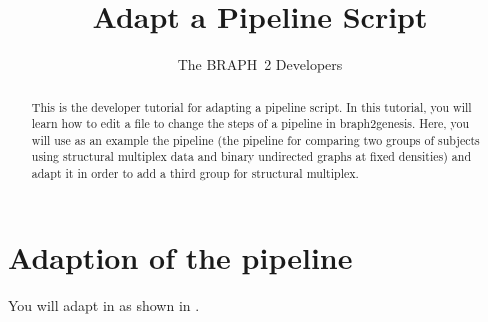 \documentclass{tufte-handout}
\title{Adapt a Pipeline Script}
\author[The BRAPH~2 Developers]{The BRAPH~2 Developers}
\begin{document}
\maketitle

\begin{abstract}
\noindent
This is the developer tutorial for adapting a pipeline script. 
In this tutorial, you will learn how to edit a  file to change the steps of a pipeline in braph2genesis. Here, you will use as an example the pipeline  (the pipeline for comparing two groups of subjects using structural multiplex data and binary undirected graphs at fixed densities) and adapt it in order to add a third group for structural multiplex.
\end{abstract}

\tableofcontents

\clearpage
\section{Adaption of the pipeline}

You will adapt in  as shown in .
\end{document}
